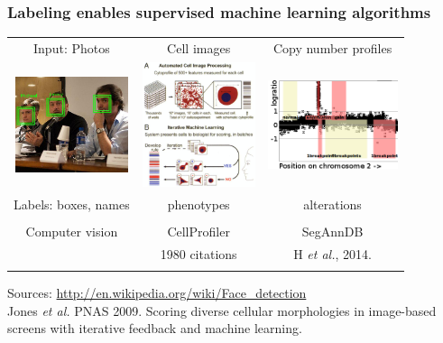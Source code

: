 \documentclass{beamer}
\begin{document}
\begin{frame}
  \frametitle{Labeling enables supervised machine learning algorithms}
  \begin{tabular}{ccc}
    Input: Photos & Cell images & Copy number profiles \\
    \includegraphics[width=1.3in]{faces} &
    \includegraphics[width=1.3in]{cellprofiler} &
    \includegraphics[width=1.5in]{regions-axes}\\
    Labels: boxes, names & phenotypes & alterations \\ \\
Computer vision
 & CellProfiler & SegAnnDB \\
 & 
1980 citations
 & H {\it et al.}, 2014. \\
     &
  \end{tabular}
  Sources: \url{http://en.wikipedia.org/wiki/Face_detection}\\
  Jones {\it et al.} PNAS 2009. Scoring diverse cellular morphologies in
  image-based screens with iterative feedback and machine learning.
\end{frame}
\end{document}
